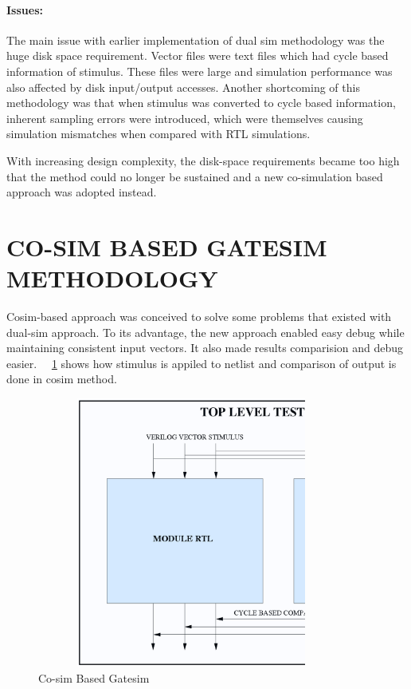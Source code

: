 \paragraph{Issues:}The main issue with earlier implementation of dual sim methodology was the huge disk space requirement. Vector files were text files which had cycle based information of stimulus. These files were large and simulation performance was also affected by disk input/output accesses. Another shortcoming of this methodology was that when stimulus was converted to cycle based information, inherent sampling errors were introduced, which were themselves causing simulation mismatches when compared with RTL simulations.

 
 With increasing design complexity, the disk-space requirements became too high that the method could no longer be sustained and a new co-simulation based approach was adopted instead.





\section{CO-SIM BASED GATESIM METHODOLOGY}
 Cosim-based approach was conceived to solve some problems that existed with dual-sim approach. To its advantage, the new approach enabled easy debug while maintaining consistent input vectors. It also made results comparision and debug easier.  ~\figurename{~\ref{fig:cosim.ps}} shows how stimulus is appiled to netlist and comparison of output is done in cosim method.
 
\begin{figure}[h!]
\centering
\includegraphics[width=4in, height=3.5in]{./figures/cosim.ps}
\caption{Co-sim Based Gatesim}
\label{fig:cosim.ps}
\end{figure}


